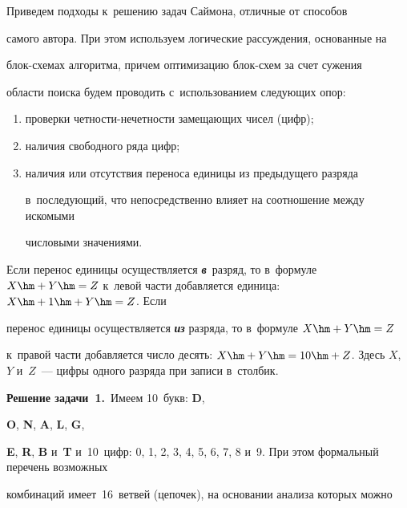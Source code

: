     Приведем подходы к~решению задач Саймона, отличные от способов 


самого автора. При этом используем логические рассуждения, основанные на 


блок-схе\-мах алгоритма, причем оптимизацию блок-схем за счет сужения 


области поиска будем проводить с~использованием следующих опор: 


    \begin{enumerate}[(1)]


    \item проверки четности-нечетности замещающих чисел (цифр);


    \item наличия свободного ряда цифр;


    \item наличия или отсутствия переноса единицы из предыдущего разряда 


в~последующий, что непосредственно влияет на соотношение между искомыми 


числовыми значениями. 


    \end{enumerate}


    


    Если перенос единицы осуществляется {\bfseries\textit{в}}~разряд, то в~формуле $X \hm+ Y 


\hm= Z$ к~левой части добавляется единица: $X \hm+ 1 \hm+ Y \hm= Z$. Если 


перенос единицы осуществляется {\bfseries\textit{из}} разряда, то в~формуле $X \hm+ Y \hm= Z$ 


к~правой части добавляется число десять: $X \hm+ Y \hm= 10 


\hm+ Z$. Здесь $X$, $Y$ и~$Z$~--- цифры одного разряда при записи в~столбик.


    


   \smallskip


    


    \textbf{Решение задачи~1.}\ Имеем 10~букв: \textbf{D}, 


    \textbf{O}, \textbf{N}, \textbf{A}, \textbf{L}, \textbf{G}, 


    \textbf{E}, \textbf{R}, \textbf{B} и~\textbf{T} и~10~цифр: 0, 1, 2, 3, 4, 5, 6, 7, 8 и~9. При этом формальный перечень возможных 


комбинаций имеет~16~ветвей (цепочек), на основании анализа которых можно 



